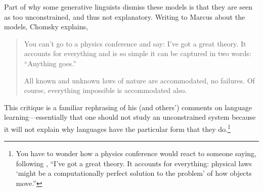 \documentclass[output=paper,colorlinks,citecolor=brown
]{langscibook}
\begin{document}
Part of why some generative linguists dismiss these models is that they are seen as too unconstrained, and thus not explanatory. Writing to Marcus about the models, Chomsky explains, 
\begin{quote}
You can’t go to a physics conference and say: I’ve got a great theory.  It accounts for everything and is so simple it can be captured in two words: “Anything goes.”
    
All known and unknown laws of nature are accommodated, no failures.  Of course, everything impossible is accommodated also.
\end{quote}
This critique is a familiar rephrasing of his (and others') comments on language learning---essentially that one should not study an unconstrained system because it will not explain why languages have the particular form that they do.\footnote{ You have to wonder how a physics conference would react to someone saying, following  \cite{lasnik2002minimalist}, ``I've got a great theory. It accounts for everything: physical laws `might be a computationally perfect solution to the problem' of how objects move.''}
\end{document}
